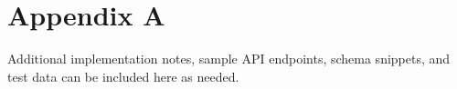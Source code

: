 \section{Appendix A}

Additional implementation notes, sample API endpoints, schema snippets, and test data can be included here as needed.
